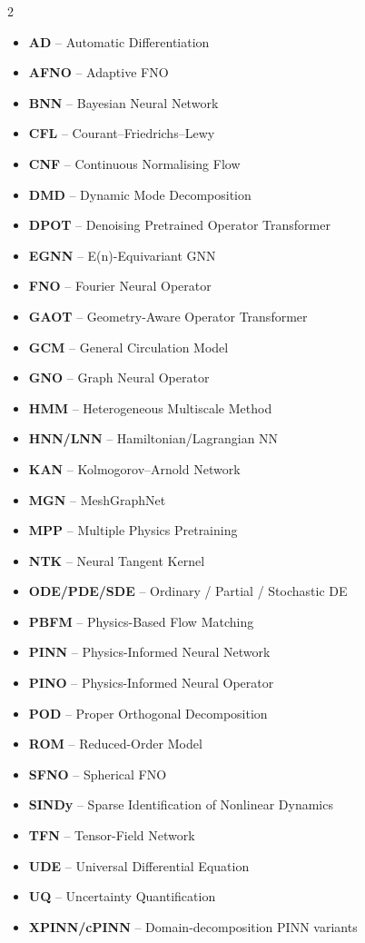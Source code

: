 \begin{multicols}{2}
\small
\begin{itemize}
\item \textbf{AD} -- Automatic Differentiation
\item \textbf{AFNO} -- Adaptive FNO
\item \textbf{BNN} -- Bayesian Neural Network
\item \textbf{CFL} -- Courant--Friedrichs--Lewy
\item \textbf{CNF} -- Continuous Normalising Flow
\item \textbf{DMD} -- Dynamic Mode Decomposition
\item \textbf{DPOT} -- Denoising Pretrained Operator Transformer
\item \textbf{EGNN} -- E(n)-Equivariant GNN
\item \textbf{FNO} -- Fourier Neural Operator
\item \textbf{GAOT} -- Geometry-Aware Operator Transformer
\item \textbf{GCM} -- General Circulation Model
\item \textbf{GNO} -- Graph Neural Operator
\item \textbf{HMM} -- Heterogeneous Multiscale Method
\item \textbf{HNN/LNN} -- Hamiltonian/Lagrangian NN
\item \textbf{KAN} -- Kolmogorov--Arnold Network
\item \textbf{MGN} -- MeshGraphNet
\item \textbf{MPP} -- Multiple Physics Pretraining
\item \textbf{NTK} -- Neural Tangent Kernel
\item \textbf{ODE/PDE/SDE} -- Ordinary / Partial / Stochastic DE
\item \textbf{PBFM} -- Physics-Based Flow Matching
\item \textbf{PINN} -- Physics-Informed Neural Network
\item \textbf{PINO} -- Physics-Informed Neural Operator
\item \textbf{POD} -- Proper Orthogonal Decomposition
\item \textbf{ROM} -- Reduced-Order Model
\item \textbf{SFNO} -- Spherical FNO
\item \textbf{SINDy} -- Sparse Identification of Nonlinear Dynamics
\item \textbf{TFN} -- Tensor-Field Network
\item \textbf{UDE} -- Universal Differential Equation
\item \textbf{UQ} -- Uncertainty Quantification
\item \textbf{XPINN/cPINN} -- Domain-decomposition PINN variants
\end{itemize}
\end{multicols}

